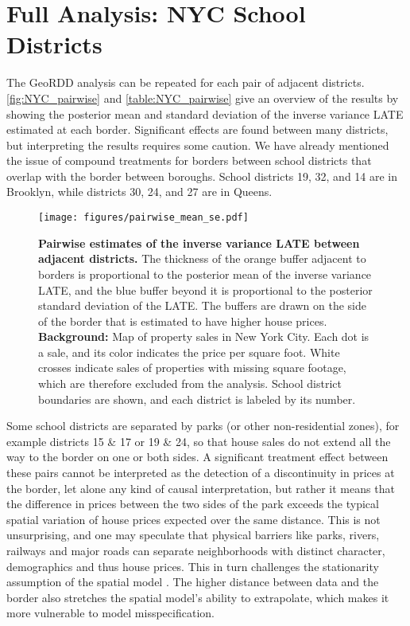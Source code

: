 \section{Full Analysis: NYC School Districts}
\label{pairs-of-school-districts}

	The GeoRDD analysis can be repeated for each pair of adjacent districts.
\autoref{fig:NYC_pairwise} and \autoref{table:NYC_pairwise} give an overview of the results by showing the posterior mean and standard deviation of the inverse variance LATE estimated at each border.
Significant effects are found between many districts, but interpreting the results requires some caution.
We have already mentioned the issue of compound treatments for borders between school districts that overlap with the border between boroughs.
School districts 19, 32, and 14 are in Brooklyn, while districts 30, 24, and 27 are in Queens.

\begin{figure}
    \centering
    \texttt{[image: figures/pairwise\_mean\_se.pdf]}
    \caption[]{
		\label{fig:NYC_pairwise}
        \textbf{Pairwise estimates of the inverse variance LATE between adjacent districts.}
        The thickness of the orange buffer adjacent to borders is proportional to the posterior mean of the inverse variance LATE, and the blue buffer beyond it is proportional to the posterior standard deviation of the LATE.
    The buffers are drawn on the side of the border that is estimated to have higher house prices. 
        \\\hspace{\textwidth}
        \textbf{Background:} 
        Map of property sales in New York City. Each dot is a sale, and its color indicates the price per square foot. White crosses indicate sales of properties with missing square footage, which are therefore excluded from the analysis. School district boundaries are shown, and each district is labeled by its number.
    }
\end{figure}

	Some school districts are separated by parks (or other non-residential zones), for example districts 15 \& 17 or 19 \& 24, so that house sales do not extend all the way to the border on one or both sides.
A significant treatment effect between these pairs cannot be interpreted as the detection of a discontinuity in prices at the border, let alone any kind of causal interpretation, but rather it means that the difference in prices between the two sides of the park exceeds the typical spatial variation of house prices expected over the same distance.
This is not unsurprising, and one may speculate that physical barriers like parks, rivers, railways and major roads can separate neighborhoods with distinct character, demographics and thus house prices.
This in turn challenges the stationarity assumption of the spatial model .
The higher distance between data and the border also stretches the spatial model's ability to extrapolate, which makes it more vulnerable to model misspecification.

